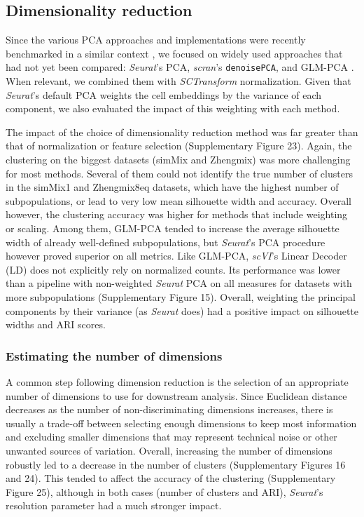 \documentclass{bmcart}
\begin{document}
\subsection*{Dimensionality reduction}

Since the various PCA approaches and implementations were recently benchmarked in a similar context \cite{TsuyuzakiPCA2020}, we focused on widely used approaches that had not yet been compared: \textit{Seurat}'s PCA, \textit{scran}'s \texttt{denoisePCA}, and GLM-PCA \cite{townesGlmpca2019}. When relevant, we combined them with \textit{SCTransform} normalization. Given that \textit{Seurat}'s default PCA weights the cell embeddings by the variance of each component, we also evaluated the impact of this weighting with each method.

The impact of the choice of dimensionality reduction method was far greater than that of normalization or feature selection (Supplementary Figure 23). Again, the clustering on the biggest datasets (simMix and Zhengmix) was more challenging for most methods. Several of them could not identify the true number of clusters in the simMix1 and Zhengmix8eq datasets, which have the highest number of subpopulations, or lead to very low mean silhouette width and accuracy. Overall however, the clustering accuracy was higher for methods that include weighting or scaling. Among them, GLM-PCA tended to increase the average silhouette width of already well-defined subpopulations, but \textit{Seurat}'s PCA procedure however proved superior on all metrics. Like GLM-PCA, \textit{scVI}'s Linear Decoder (LD) does not explicitly rely on normalized counts. Its performance was lower than a pipeline with non-weighted \textit{Seurat} PCA on all measures for datasets with more subpopulations (Supplementary Figure 15). 
Overall, weighting the principal components by their variance (as \textit{Seurat} does) had a positive impact on silhouette widths and ARI scores.

\subsubsection*{Estimating the number of dimensions}

A common step following dimension reduction is the selection of an appropriate number of dimensions to use for downstream analysis. Since Euclidean distance decreases as the number of non-discriminating dimensions increases, there is usually a trade-off between selecting enough dimensions to keep most information and excluding smaller dimensions that may represent technical noise or other unwanted sources of variation. Overall, increasing the number of dimensions robustly led to a decrease in the number of clusters (Supplementary Figures 16 and 24). This tended to affect the accuracy of the clustering (Supplementary Figure 25), although in both cases (number of clusters and ARI), \textit{Seurat}'s resolution parameter had a much stronger impact.
\end{document}
